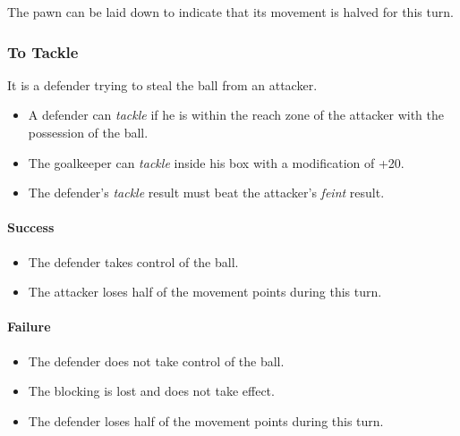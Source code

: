 \documentclass[12pt]{article}
\begin{document}
\begin{hint}
The pawn can be laid down to indicate that its movement is halved for this turn.
\end{hint}

\subsubsection{To Tackle}
It is a defender trying to steal the ball from an attacker.

\begin{rulebox}
\begin{itemize}
\item A defender can \emph{tackle} if he is within the reach zone of the attacker with the possession of the ball.
\item The goalkeeper can \emph{tackle} inside his box with a modification of +20.
\item The defender's \emph{tackle }result must beat the attacker's \emph{feint }result.
\end{itemize}
\end{rulebox}

\paragraph{Success}

\begin{rulebox}
\begin{itemize}
\item The defender takes control of the ball.
\item The attacker loses half of the movement points during this turn.
\end{itemize}
\end{rulebox}

\paragraph{Failure}

\begin{rulebox}
\begin{itemize}
\item The defender does not take control of the ball.
\item The blocking is lost and does not take effect.
\item The defender loses half of the movement points during this turn.
\end{itemize}
\end{rulebox}
\end{document}
